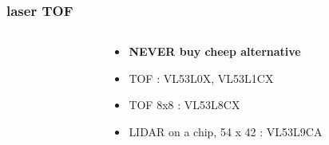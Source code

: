\documentclass{beamer}
\begin{document}
\begin{frame}
  
  \frametitle{\bf laser TOF}

  \begin{columns}

    \begin{column}{0.5\textwidth}
    \end{column}

    \begin{column}{0.5\textwidth}
      \begin{itemize}
        \item  {\color{red} \bf{ NEVER } buy cheep alternative}
        \item TOF : VL53L0X, VL53L1CX
        \item TOF 8x8 : VL53L8CX
        \item LIDAR on a chip, 54 x 42 : VL53L9CA
      \end{itemize}
    \end{column}

  \end{columns}

\end{frame}
\end{document}

